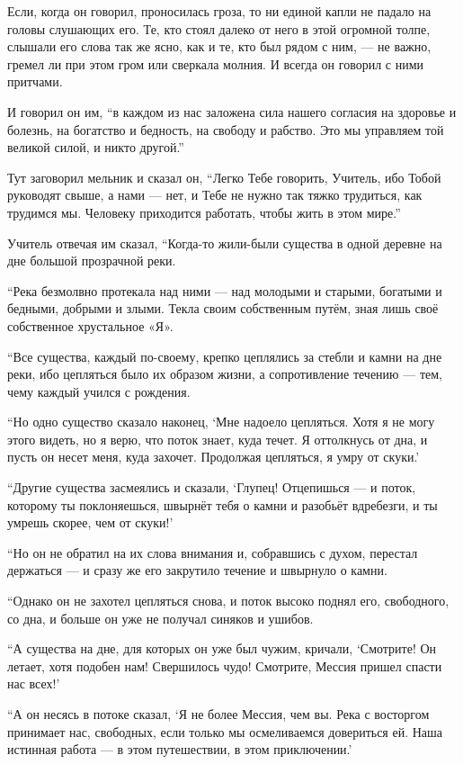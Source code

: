 Если, когда он говорил, проносилась гроза, то ни единой капли не падало на головы слушающих его. Те, кто стоял далеко от него в этой огромной толпе, слышали его слова так же ясно, как и те, кто был рядом с ним, --- не важно, гремел ли при этом гром или сверкала молния. И всегда он говорил с ними притчами.

И говорил он им, ``в каждом из нас заложена сила нашего согласия на здоровье и болезнь, на богатство и бедность, на свободу и рабство. Это мы управляем той великой силой, и никто другой.''

Тут заговорил мельник и сказал он, ``Легко Тебе говорить, Учитель, ибо Тобой руководят свыше, а нами --- нет, и Тебе не нужно так тяжко трудиться, как трудимся мы. Человеку приходится работать, чтобы жить в этом мире.''

Учитель отвечая им сказал, ``Когда-то жили-были существа в одной деревне на дне большой прозрачной реки.

``Река безмолвно протекала над ними --- над молодыми и старыми, богатыми и бедными, добрыми и злыми.
 Текла своим собственным путём, зная лишь своё собственное хрустальное «Я».

``Все существа, каждый по-своему, крепко цеплялись за стебли и камни на дне реки, ибо цепляться было их образом жизни, а сопротивление течению --- тем, чему каждый учился с рождения.

``Но одно существо сказало наконец, `Мне надоело цепляться. Хотя я не могу этого видеть, но я верю, что поток знает, куда течет. Я оттолкнусь от дна, и пусть он несет меня, куда захочет. Продолжая цепляться, я умру от скуки.'

``Другие существа засмеялись и сказали, `Глупец! Отцепишься --- и поток, которому ты поклоняешься, швырнёт тебя о камни и разобьёт вдребезги, и ты умрешь скорее, чем от скуки!'

``Но он не обратил на их слова внимания и, собравшись с духом, перестал держаться --- и сразу же его закрутило течение и швырнуло о камни.

``Однако он не захотел цепляться снова, и поток высоко поднял его, свободного, со дна, и больше он уже не получал синяков и ушибов.

``А существа на дне, для которых он уже был чужим, кричали, `Смотрите! Он летает, хотя подобен нам! Свершилось чудо! Смотрите, Мессия пришел спасти нас всех!'

``А он несясь в потоке сказал, `Я не более Мессия, чем вы. Река с восторгом принимает нас, свободных, если только мы осмеливаемся довериться ей. Наша истинная работа --- в этом путешествии, в этом приключении.'

